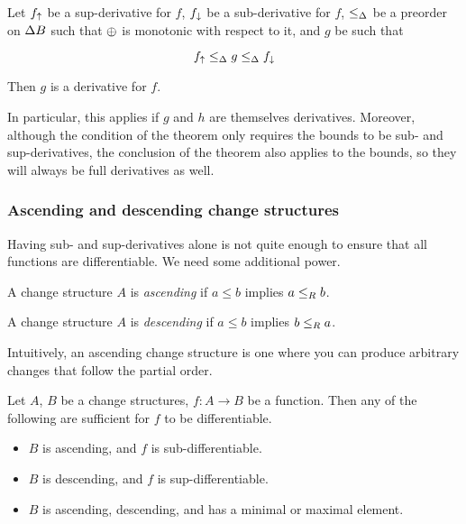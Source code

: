 \begin{thm}
  \label{thm:sandwich}
  Let $f_\uparrow$ be a sup-derivative for $f$, $f_\downarrow$ be a sub-derivative for $f$, $\leq_\Delta$ be a preorder on $\Delta B$ such that $\oplus$ is monotonic with
  respect to it, and $g$ be such that

  $$f_\uparrow \leq_\Delta g \leq_\Delta f_\downarrow$$

  Then $g$ is a derivative for $f$.
\end{thm}

In particular, this applies if $g$ and $h$ are themselves derivatives. Moreover,
although the condition of the theorem only requires the bounds to be sub- and
sup-derivatives, the conclusion of the theorem also applies to the bounds, so
they will always be full derivatives as well.

\subsubsection{Ascending and descending change structures}

Having sub- and sup-derivatives alone is not quite enough to ensure that all
functions are differentiable. We need some additional power.

\begin{defn}
  A change structure $A$ is \textit{ascending} if $a \leq b$ implies $a
  \leq_R b$.

  A change structure $A$ is \textit{descending} if $a \leq b$ implies $b
  \leq_R a$.
\end{defn}

Intuitively, an ascending change structure is one where you can produce
arbitrary changes that follow the partial order.

\begin{thm}
  Let $A$, $B$ be a change structures, $f: A \rightarrow B$ be a function. Then
  any of the following are sufficient for $f$ to be differentiable.
  \begin{itemize}
    \item $B$ is ascending, and $f$ is sub-differentiable.
    \item $B$ is descending, and $f$ is sup-differentiable.
    \item $B$ is ascending, descending, and has a minimal or maximal element.
  \end{itemize}
\end{thm}

